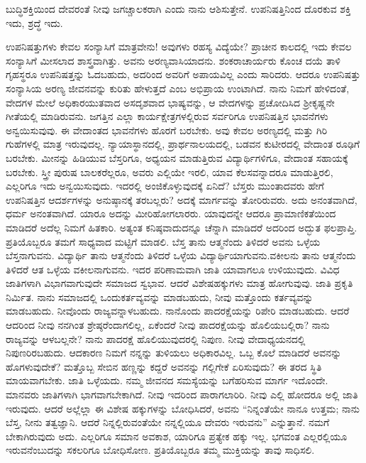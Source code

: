 ಬುದ್ಧಿಶಕ್ತಿಯಿಂದ ದೇವರಂತೆ ನೀವು ಜಗಚ್ಚಾಲಕರಾಗಿ ಎಂದು ನಾನು ಆಶಿಸುತ್ತೇನೆ. ಉಪನಿಷತ್ತಿನಿಂದ ದೊರಕುವ ಶಕ್ತಿ ಇದು, ಶ್ರದ್ಧೆ ಇದು.

ಉಪನಿಷತ್ತುಗಳು ಕೇವಲ ಸಂನ್ಯಾಸಿಗೆ ಮಾತ್ರವೇನು! ಅವುಗಳು ರಹಸ್ಯ ವಿದ್ಯೆಯೇ? ಪ್ರಾಚೀನ ಕಾಲದಲ್ಲಿ ಇದು ಕೇವಲ ಸಂನ್ಯಾಸಿಗೆ ಮೀಸಲಾದ ಶಾಸ್ತ್ರವಾಗಿತ್ತು. ಅವನು ಅರಣ್ಯವಾಸಿಯಾದನು. ಶಂಕರಾಚಾರ್ಯರು ಕೊಂಚ ದಯೆ ತಾಳಿ ಗೃಹಸ್ಥರೂ ಉಪನಿಷತ್ತನ್ನು ಓದಬಹುದು, ಅದರಿಂದ ಅವರಿಗೆ ಅಪಾಯವಿಲ್ಲ ಎಂದು ಸಾರಿದರು. ಆದರೂ ಉಪನಿಷತ್ತು ಸಂನ್ಯಾಸಿಯ ಅರಣ್ಯ ಜೀವನವನ್ನು ಕುರಿತು ಹೇಳುತ್ತದೆ ಎಂಬ ಅಭಿಪ್ರಾಯ ಉಂಟಾಗಿದೆ. ನಾನು ನಿಮಗೆ ಹೇಳಿದಂತೆ, ವೇದಗಳ ಮೇಲೆ ಅಧಿಕಾರಯುತವಾದ ಅಸದೃಶವಾದ ಭಾಷ್ಯವನ್ನು, ಆ ವೇದಗಳನ್ನು ಪ್ರಚೋದಿಸಿದ ಶ‍್ರೀಕೃಷ್ಣನೇ ಗೀತೆಯಲ್ಲಿ ಮಾಡಿರುವನು. ಜಗತ್ತಿನ ಎಲ್ಲಾ ಕಾರ್ಯಕ್ಷೇತ್ರಗಳಲ್ಲಿರುವ ಸರ್ವರಿಗೂ ಉಪನಿಷತ್ತಿನ ಭಾವನೆಗಳು ಅನ್ವಯಿಸುವುವು. ಈ ವೇದಾಂತದ ಭಾವನೆಗಳು ಹೊರಗೆ ಬರಬೇಕು. ಅವು ಕೇವಲ ಅರಣ್ಯದಲ್ಲಿ ಮತ್ತು ಗಿರಿ ಗುಹೆಗಳಲ್ಲಿ ಮಾತ್ರ ಇರುವುದಲ್ಲ. ನ್ಯಾಯಾಸ್ಥಾನದಲ್ಲಿ, ಪ್ರಾರ್ಥನಾಲಯದಲ್ಲಿ, ಬಡವನ ಕುಟೀರದಲ್ಲಿ ವೇದಾಂತ ರೂಢಿಗೆ ಬರಬೇಕು. ಮೀನನ್ನು ಹಿಡಿಯುವ ಬೆಸ್ತರಿಗೂ, ಅಧ್ಯಯನ ಮಾಡುತ್ತಿರುವ ವಿದ್ಯಾರ್ಥಿಗಳಿಗೂ, ವೇದಾಂತ ಸಹಾಯಕ್ಕೆ ಬರಬೇಕು. ಸ್ತ್ರೀ ಪುರುಷ ಬಾಲಕರೆಲ್ಲರೂ, ಅವರು ಎಲ್ಲಿಯೇ ಇರಲಿ, ಯಾವ ಕೆಲಸವನ್ನಾದರೂ ಮಾಡುತ್ತಿರಲಿ, ಎಲ್ಲರಿಗೂ ಇದು ಅನ್ವಯಿಸುವುದು. ಇದರಲ್ಲಿ ಅಂಜಿಕೊಳ್ಳುವುದಕ್ಕೆ ಏನಿದೆ? ಬೆಸ್ತರು ಮುಂತಾದವರು ಹೇಗೆ ಉಪನಿಷತ್ತಿನ ಆದರ್ಶಗಳನ್ನು ಅನುಷ್ಠಾನಕ್ಕೆ ತರಬಲ್ಲರು? ಅದಕ್ಕೆ ಮಾರ್ಗವನ್ನು ತೋರಿರುವರು. ಅದು ಅನಂತವಾಗಿದೆ, ಧರ್ಮ ಅನಂತವಾಗಿದೆ. ಯಾರೂ ಅದನ್ನು ಮೀರಿಹೋಗಲಾರರು. ಯಾವುದನ್ನೇ ಆದರೂ ಪ್ರಾಮಾಣಿಕತೆಯಿಂದ ಮಾಡಿದರೆ ಅದೆಲ್ಲ ನಿಮಗೆ ಹಿತಕಾರಿ. ಅತ್ಯಂತ ಕನಿಷ್ಠವಾದುದನ್ನೂ ಚೆನ್ನಾಗಿ ಮಾಡಿದರೆ ಅದರಿಂದ ಅದ್ಭುತ ಫಲಪ್ರಾಪ್ತಿ. ಪ್ರತಿಯೊಬ್ಬರೂ ತಮಗೆ ಸಾಧ್ಯವಾದ ಮಟ್ಟಿಗೆ ಮಾಡಲಿ. ಬೆಸ್ತ ತಾನು ಆತ್ಮನೆಂದು ತಿಳಿದರೆ ಅವನು ಒಳ್ಳೆಯ ಬೆಸ್ತನಾಗುವನು. ವಿದ್ಯಾರ್ಥಿ ತಾನು ಆತ್ಮನೆಂದು ತಿಳಿದರೆ ಒಳ್ಳೆಯ ವಿದ್ಯಾರ್ಥಿಯಾಗುವನು.\break ವಕೀಲನು ತಾನು ಆತ್ಮನೆಂದು ತಿಳಿದರೆ ಆತ ಒಳ್ಳೆಯ ವಕೀಲನಾಗುವನು. ಇದರ ಪರಿಣಾಮವಾಗಿ ಜಾತಿ ಯಾವಾಗಲೂ ಉಳಿಯುವುದು. ವಿವಿಧ ಜಾತಿ\-ಗಳಾಗಿ ವಿಭಾಗವಾಗುವುದೇ ಸಮಾಜದ ಸ್ವಭಾವ. ಆದರೆ ವಿಶೇಷಹಕ್ಕುಗಳು ಮಾತ್ರ ಹೋಗುವುವು. ಜಾತಿ ಪ್ರಕೃತಿ ನಿರ್ಮಿತ. ನಾನು ಸಮಾಜದಲ್ಲಿ ಒಂದು\break ಕರ್ತವ್ಯವನ್ನು ಮಾಡಬಹುದು, ನೀವು ಮತ್ತೊಂದು ಕರ್ತವ್ಯವನ್ನು ಮಾಡಬಹುದು. ನೀವೊಂದು ರಾಜ್ಯವನ್ನಾಳಬಹುದು. ನಾನೊಂದು ಪಾದರಕ್ಷೆಯನ್ನು ರಿಪೇರಿ ಮಾಡಬಹುದು. ಆದರೆ ಆದರಿಂದ ನೀವು ನನಗಿಂತ ಶ್ರೇಷ್ಠರೆಂದಾಗಲಿಲ್ಲ, ಏಕೆಂದರೆ ನೀವು ಪಾದರಕ್ಷೆಯನ್ನು ಹೊಲಿಯಬಲ್ಲಿರಾ? ನಾನು ರಾಜ್ಯವನ್ನು ಆಳಬಲ್ಲನೇ? ನಾನು ಪಾದರಕ್ಷೆ ಹೊಲಿಯುವುದರಲ್ಲಿ ನಿಪುಣ. ನೀವು ವೇದಾಧ್ಯಯನದಲ್ಲಿ ನಿಪುಣರಿರಬಹುದು. ಆದಕಾರಣ ನಿಮಗೆ ನನ್ನನ್ನು ತುಳಿಯಲು ಅಧಿಕಾರವಿಲ್ಲ. ಒಬ್ಬ ಕೊಲೆ ಮಾಡಿದರೆ ಅವನನ್ನು ಹೊಗಳುವುದೇಕೆ? ಮತ್ತೊಬ್ಬ ಸೇಬಿನ ಹಣ್ಣನ್ನು ಕದ್ದರೆ ಅವನನ್ನು ಗಲ್ಲಿಗೇಕೆ ಏರಿಸುವುದು? ಈ ತರದ ಸ್ಥಿತಿ ಮಾಯವಾಗಬೇಕು. ಜಾತಿ ಒಳ್ಳೆಯದು. ನಮ್ಮ ಜೀವನದ ಸಮಸ್ಯೆಯನ್ನು ಬಗೆಹರಿಸುವ ಮಾರ್ಗ ಇದೊಂದೇ. ಮಾನವರು ಜಾತಿಗಳಾಗಿ ಭಾಗವಾಗಬೇಕಾಗಿದೆ. ನೀವು ಇದರಿಂದ ಪಾರಾಗಲಾರಿರಿ. ನೀವು ಎಲ್ಲಿ ಹೋದರೂ ಅಲ್ಲಿ ಜಾತಿ ಇರುವುದು. ಆದರೆ ಅಲ್ಲೆಲ್ಲಾ ಈ ವಿಶೇಷ ಹಕ್ಕುಗಳನ್ನು ಬೋಧಿಸಿದರೆ, ಅವನು “ನಿನ್ನಂತೆಯೇ ನಾನೂ ಉತ್ತಮ; ನಾನು ಬೆಸ್ತ, ನೀನು ತತ್ವಜ್ಞಾನಿ. ಆದರೆ ನಿನ್ನಲ್ಲಿರುವಂತೆಯೇ ನನ್ನಲ್ಲಿಯೂ ದೇವರು ಇರುವನು” ಎನ್ನುತ್ತಾನೆ. ನಮಗೆ ಬೇಕಾಗಿರುವುದು ಅದು. ಎಲ್ಲರಿಗೂ ಸಮಾನ ಅವಕಾಶ, ಯಾರಿಗೂ ಪ್ರತ್ಯೇಕ ಹಕ್ಕು ಇಲ್ಲ. ಭಗವಂತ ಎಲ್ಲರಲ್ಲಿಯೂ ಇರುವನೆಂಬುದನ್ನು ಸಕಲರಿಗೂ ಬೋಧಿಸೋಣ. ಪ್ರತಿಯೊಬ್ಬರೂ ತಮ್ಮ ಮುಕ್ತಿಯನ್ನು ತಾವು ಸಾಧಿಸಲಿ.

